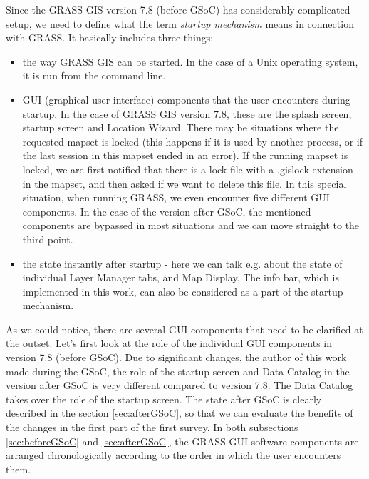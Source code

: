 \documentclass[a4paper,10pt,twoside]{article}
\begin{document}
\noindent Since the GRASS GIS version 7.8 (before GSoC) has considerably complicated setup, we need to define what the term \textit{startup mechanism} means in connection with GRASS. It basically includes three things:  

\begin {itemize}

\item the way GRASS GIS can be started. In the case of a Unix operating system, it is run from the command line.

\item GUI (graphical user interface) components that the user encounters during startup. In the case of GRASS GIS version 7.8, these are the splash screen, startup screen and Location Wizard. There may be situations where the requested mapset is locked (this happens if it is used by another process, or if the last session in this mapset ended in an error). If the running mapset is locked, we are first notified that there is a lock file with a .gislock extension in the mapset, and then asked if we want to delete this file. In this special situation, when running GRASS, we even encounter five different GUI components.
In the case of the version after GSoC, the mentioned components are bypassed in most situations and we can move straight to the third point.

\item the state instantly after startup - here we can talk e.g. about the state of individual Layer Manager tabs, and Map Display. The info bar, which is implemented in this work, can also be considered as a part of the startup mechanism.

\end{itemize}

\noindent As we could notice, there are several GUI components that need to be clarified at the outset. Let's first look at the role of the individual GUI components in version 7.8 (before GSoC). Due to significant changes, the author of this work made during the GSoC,  the role of the startup screen and Data Catalog in the version after GSoC is very different compared to version 7.8. The Data Catalog takes over the role of the startup screen. The state after GSoC is clearly described in the section \ref{sec:afterGSoC},  so that we can evaluate the benefits of the changes in the first part of the first survey. In both subsections \ref{sec:beforeGSoC} and \ref{sec:afterGSoC}, the GRASS GUI software components are arranged chronologically according to the order in which the user encounters them.
\end{document}
